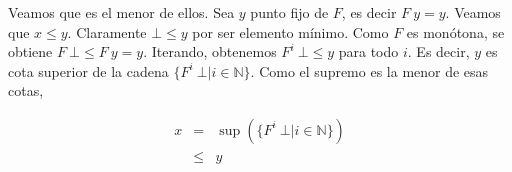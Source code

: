     \PN Veamos que es el menor de ellos. Sea $y$ punto fijo de $F$, es decir $F\ y = y$. Veamos que $x \leq y$. Claramente $\bot \leq y$ por ser elemento mínimo. Como $F$ es monótona, se obtiene $F\ \bot \leq F\ y = y$. Iterando, obtenemos $F^i\ \bot \leq y$ para todo $i$. Es decir, $y$ es cota superior de la cadena $\{F^i\ \bot|i \in \mathbb N\}$. Como el supremo es la menor de esas cotas,

    \[
      \begin{array}{rcl}
        x &=& \sup(\{F^i\ \bot|i \in \mathbb N\}) \\
               & \leq & y
      \end{array}
    \]